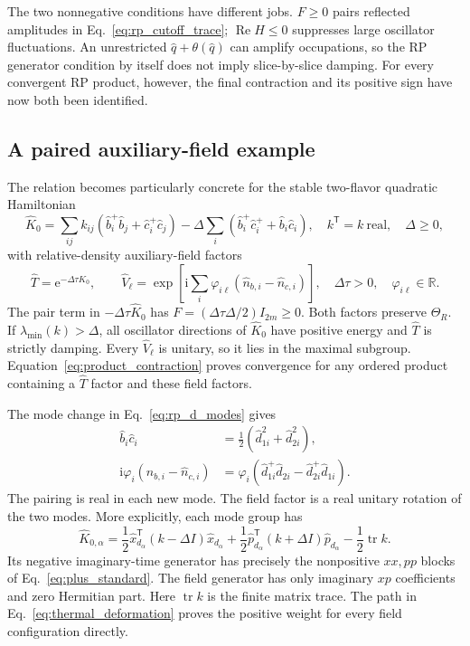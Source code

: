 \documentclass[11pt,a4paper]{article}
\newcommand{\tr}{\operatorname{tr}}
\newcommand{\ee}{\mathrm e}
\newcommand{\ii}{\mathrm i}
\newcommand{\trans}{\mathsf T}
\numberwithin{equation}{section}
\begin{document}
The two nonnegative conditions have different jobs.
$F\geq0$ pairs reflected amplitudes in Eq.~\eqref{eq:rp_cutoff_trace};
$\operatorname{Re}H\leq0$ suppresses large oscillator fluctuations.
An unrestricted $\hat q+\theta(\hat q)$ can amplify occupations, so
the RP generator condition by itself does not imply slice-by-slice
damping. For every convergent RP product, however, the final
contraction and its positive sign have now both been identified.

\subsection{A paired auxiliary-field example}

The relation becomes particularly concrete for the stable two-flavor
quadratic Hamiltonian
\begin{equation}
 \hat K_0=\sum_{ij}k_{ij}
   (\hat b_i^+\hat b_j+\hat c_i^+\hat c_j)
 -\Delta\sum_i(\hat b_i^+\hat c_i^++\hat b_i\hat c_i),
 \quad k^\trans=k\ \text{real},\quad\Delta\geq0,
 \label{eq:rp_example_hamiltonian}
\end{equation}
with relative-density auxiliary-field factors
\begin{equation}
 \hat T=\ee^{-\Delta\tau\hat K_0},\qquad
 \hat V_\ell=\exp\!\left[
 \ii\sum_i\varphi_{i\ell}(\hat n_{b,i}-\hat n_{c,i})\right],
 \quad \Delta\tau>0,\quad\varphi_{i\ell}\in\mathbb R.
 \label{eq:rp_example_factors}
\end{equation}
The pair term in $-\Delta\tau\hat K_0$ has
$F=(\Delta\tau\Delta/2)I_{2m}\geq0$.
Both factors preserve $\Theta_R$.
If $\lambda_{\min}(k)>\Delta$, all oscillator directions of
$\hat K_0$ have positive energy and $\hat T$ is strictly damping.
Every $\hat V_\ell$ is unitary, so it lies in the maximal subgroup.
Equation~\eqref{eq:product_contraction} proves convergence for any
ordered product containing a $\hat T$ factor and these field factors.

The mode change in Eq.~\eqref{eq:rp_d_modes} gives
\begin{align}
 \hat b_i\hat c_i&=\frac12(\hat d_{1i}^2+\hat d_{2i}^2),\nonumber\\
 \ii\varphi_i(\hat n_{b,i}-\hat n_{c,i})
 &=\varphi_i(\hat d_{1i}^+\hat d_{2i}
             -\hat d_{2i}^+\hat d_{1i}).
 \label{eq:rp_example_transformed}
\end{align}
The pairing is real in each new mode. The field factor is a real
unitary rotation of the two modes. More explicitly, each mode group
has
\begin{equation}
 \hat K_{0,\alpha}
 =\frac12\hat x_{d_\alpha}^\trans(k-\Delta I)\hat x_{d_\alpha}
  +\frac12\hat p_{d_\alpha}^\trans(k+\Delta I)\hat p_{d_\alpha}
  -\frac12\tr k.
 \label{eq:rp_example_quadrature}
\end{equation}
Its negative imaginary-time generator has precisely the nonpositive
$xx,pp$ blocks of Eq.~\eqref{eq:plus_standard}. The field generator
has only imaginary $xp$ coefficients and zero Hermitian part.
Here $\tr k$ is the finite matrix trace.
The path in Eq.~\eqref{eq:thermal_deformation} proves the positive
weight for every field configuration directly.
\end{document}

